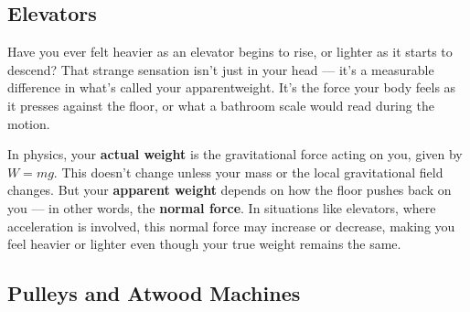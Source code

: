 		
		
		
		\subsection{Elevators}
		Have you ever felt heavier as an elevator begins to rise, or lighter as it starts to descend? That strange sensation isn’t just in your head — it’s a measurable difference in what’s called your \gls{apparentweight}. It’s the force your body feels as it presses against the floor, or what a bathroom scale would read during the motion.
		
		In physics, your \textbf{actual weight} is the gravitational force acting on you, given by \( W = mg \). This doesn't change unless your mass or the local gravitational field changes. But your \textbf{apparent weight} depends on how the floor pushes back on you — in other words, the \textbf{normal force}. In situations like elevators, where acceleration is involved, this normal force may increase or decrease, making you feel heavier or lighter even though your true weight remains the same.
		
		
		
		
		\subsection{Pulleys and Atwood Machines}
		

	



